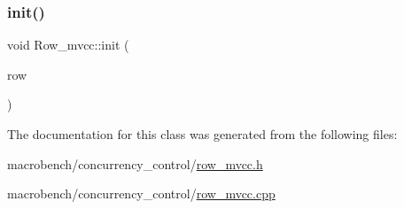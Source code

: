 \subsubsection{\texorpdfstring{init()}{init()}}
{\footnotesize\ttfamily void Row\+\_\+mvcc\+::init (\begin{DoxyParamCaption}\item[{\hyperlink{classrow__t}{row\+\_\+t} $\ast$}]{row }\end{DoxyParamCaption})}



The documentation for this class was generated from the following files\+:\begin{DoxyCompactItemize}
\item 
macrobench/concurrency\+\_\+control/\hyperlink{row__mvcc_8h}{row\+\_\+mvcc.\+h}\item 
macrobench/concurrency\+\_\+control/\hyperlink{row__mvcc_8cpp}{row\+\_\+mvcc.\+cpp}\end{DoxyCompactItemize}
